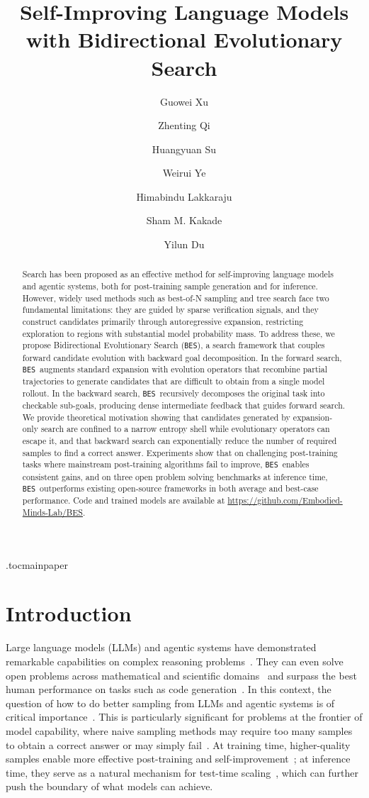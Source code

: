 \documentclass{llmxive}
\title{Self-Improving Language Models with Bidirectional Evolutionary Search}
\author{Guowei Xu \and Zhenting Qi \and Huangyuan Su \and Weirui Ye \and Himabindu Lakkaraju \and Sham M. Kakade \and Yilun Du}
\providecommand{\ours}{\texttt{BES}}
\begin{document}
\maketitle
\begin{abstract}
Search has been proposed as an effective method for self-improving language models and agentic systems, both for post-training sample generation and for inference. However, widely used methods such as best-of-N sampling and tree search face two fundamental limitations: they are guided by sparse verification signals, and they construct candidates primarily through autoregressive expansion, restricting exploration to regions with substantial model probability mass. To address these, we propose Bidirectional Evolutionary Search (\ours), a search framework that couples forward candidate evolution with backward goal decomposition. In the forward search, \ours\ augments standard expansion with evolution operators that recombine partial trajectories to generate candidates that are difficult to obtain from a single model rollout. In the backward search, \ours\ recursively decomposes the original task into checkable sub-goals, producing dense intermediate feedback that guides forward search. We provide theoretical motivation showing that candidates generated by expansion-only search are confined to a narrow entropy shell while evolutionary operators can escape it, and that backward search can exponentially reduce the number of required samples to find a correct answer. Experiments show that on challenging post-training tasks where mainstream post-training algorithms fail to improve, \ours\ enables consistent gains, and on three open problem solving benchmarks at inference time, \ours\ outperforms existing open-source frameworks in both average and best-case performance. Code and trained models are available at \url{https://github.com/Embodied-Minds-Lab/BES}.
\end{abstract}
\etocdepthtag.toc{mainpaper}


\section{Introduction}
Large language models (LLMs) and agentic systems have demonstrated remarkable capabilities on complex reasoning problems~\citep{cot, rstar, dsr1}. They can even solve open problems across mathematical and scientific domains~\citep{alphaevolve,alphaproof} and surpass the best human performance on tasks such as code generation~\citep{alphacode, tttdiscover}. In this context, the question of how to do better sampling from LLMs and agentic systems is of critical importance~\citep{rstarmath}. This is particularly significant for problems at the frontier of model capability, where naive sampling methods may require too many samples to obtain a correct answer or may simply fail~\citep{frontiermath,rlincentivize}. At training time, higher-quality samples enable more effective post-training and self-improvement~\citep{star,selfreward}; at inference time, they serve as a natural mechanism for test-time scaling~\citep{selftaught, wu2025inference, shinkaevolve}, which can further push the boundary of what models can achieve.
\end{document}
